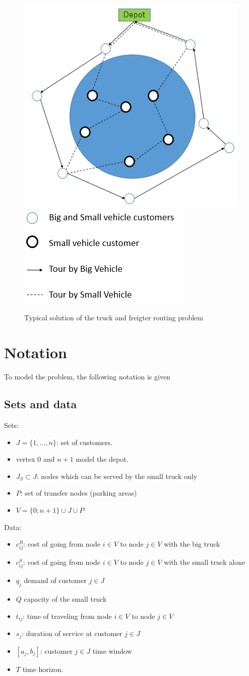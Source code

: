 \documentclass[dvipsnames,authoryear,11pt]{article}
\begin{document}
\begin{figure}[h]
	\centering
	\includegraphics[width=0.6\linewidth]{figure}
	\includegraphics[width=0.3\linewidth]{legende}
	\caption{Typical solution of the truck and freigter routing problem}
	\label{fig:fig1}
\end{figure}

\section{Notation}
	
To model the problem, the following notation is given 
	\subsection{Sets and data}
	Sets: 
	\begin{itemize}
		\item $J=\{1,...,n\}$: set of customers.
		\item vertex $0$ and $n+1$ model the depot.
		\item $J_S \subset J$: nodes which can be served by the small truck only
		\item $P$: set of transfer nodes (parking areas)
		\item $V=\{0;n+1\} \cup J \cup P$
	\end{itemize}

	Data:
	\begin{itemize}
		\item $c_{ij}^B$: cost of going from node $i\in V$ to node $j \in V$ with the big truck
		\item $c_{ij}^S$: cost of going from node $i\in V$ to node $j \in V$ with the small truck alone
		\item $q_j$ demand of customer $j\in J$
		\item $Q$ capacity of the small truck
		\item $t_{ij}$: time of traveling from node $i\in V$ to node $j \in V$
		\item $s_j$: duration of service at customer $j\in J$
		\item $[a_j,b_j]$: customer $j\in J$ time window
		\item $T$ time horizon.
	\end{itemize}
\end{document}

